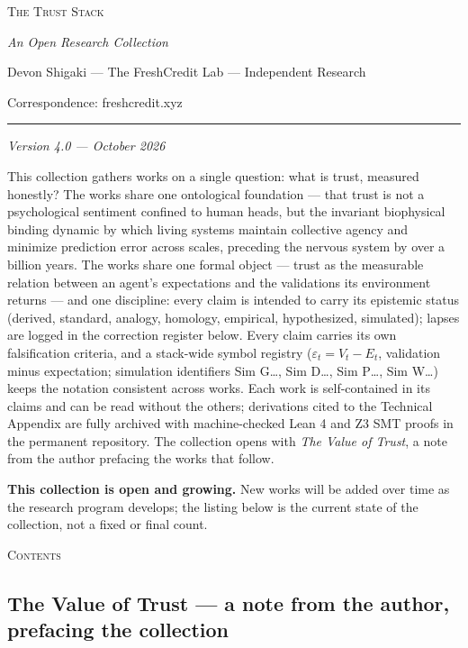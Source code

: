 \documentclass[
]{article}
\author{}
\date{}
\begin{document}
\textsc{The Trust Stack}

\emph{An Open Research Collection}

Devon Shigaki --- The FreshCredit Lab --- Independent Research

Correspondence: freshcredit.xyz

\begin{center}\rule{0.5\linewidth}{0.5pt}\end{center}

\emph{Version 4.0 --- October 2026}

This collection gathers works on a single question: what is trust,
measured honestly? The works share one ontological foundation --- that
trust is not a psychological sentiment confined to human heads, but the
invariant biophysical binding dynamic by which living systems maintain
collective agency and minimize prediction error across scales, preceding
the nervous system by over a billion years. The works share one formal
object --- trust as the measurable relation between an agent's
expectations and the validations its environment returns --- and one
discipline: every claim is intended to carry its epistemic status
(derived, standard, analogy, homology, empirical, hypothesized,
simulated); lapses are logged in the correction register below. Every
claim carries its own falsification criteria, and a stack-wide symbol
registry (\(\varepsilon_t = V_t - E_t\), validation minus expectation;
simulation identifiers Sim G\ldots, Sim D\ldots, Sim P\ldots, Sim
W\ldots) keeps the notation consistent across works. Each work is
self-contained in its claims and can be read without the others;
derivations cited to the Technical Appendix are fully archived with
machine-checked Lean 4 and Z3 SMT proofs in the permanent repository.
The collection opens with \emph{The Value of Trust}, a note from the
author prefacing the works that follow.

\textbf{This collection is open and growing.} New works will be added
over time as the research program develops; the listing below is the
current state of the collection, not a fixed or final count.

\textsc{Contents}

\subsection{The Value of Trust --- a note from the author, prefacing the
collection}\label{the-value-of-trust-a-note-from-the-author-prefacing-the-collection}
\end{document}
